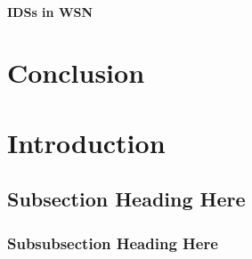 \documentclass[conference,final]{IEEEtran}
\begin{document}
\paragraph{IDSs in WSN}
\section{Conclusion}



\section{Introduction}
	\subsection{Subsection Heading Here}
		\subsubsection{Subsubsection Heading Here}
			\paragraph{}

\end{document}
